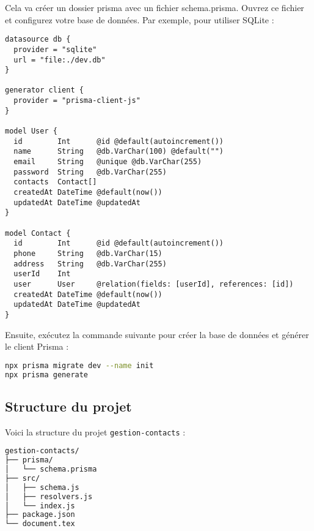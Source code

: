 \documentclass{article}
\begin{document}
Cela va créer un dossier prisma avec un fichier schema.prisma. Ouvrez ce fichier et configurez votre base de données. Par exemple, pour utiliser SQLite :
\begin{lstlisting}[language=prisma]
datasource db {
  provider = "sqlite"
  url = "file:./dev.db"
}

generator client {
  provider = "prisma-client-js"
}

model User {
  id        Int      @id @default(autoincrement())
  name      String   @db.VarChar(100) @default("")
  email     String   @unique @db.VarChar(255)
  password  String   @db.VarChar(255)
  contacts  Contact[]
  createdAt DateTime @default(now())
  updatedAt DateTime @updatedAt
}

model Contact {
  id        Int      @id @default(autoincrement())
  phone     String   @db.VarChar(15)
  address   String   @db.VarChar(255)
  userId    Int
  user      User     @relation(fields: [userId], references: [id])
  createdAt DateTime @default(now())
  updatedAt DateTime @updatedAt
}
\end{lstlisting}

Ensuite, exécutez la commande suivante pour créer la base de données et générer le client Prisma :
\begin{lstlisting}[language=bash]
npx prisma migrate dev --name init
npx prisma generate
\end{lstlisting}
\subsection{Structure du projet}
Voici la structure du projet \texttt{gestion-contacts} :
\begin{lstlisting}[language=bash]
gestion-contacts/
├── prisma/
│   └── schema.prisma
├── src/
│   ├── schema.js
│   ├── resolvers.js
│   └── index.js
├── package.json
└── document.tex
\end{lstlisting}
\end{document}
